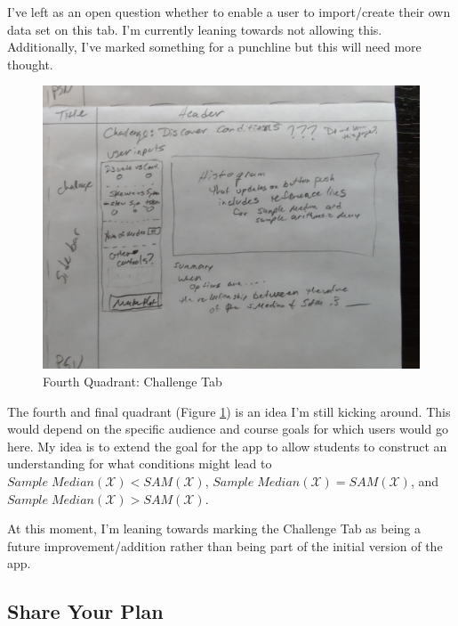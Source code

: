 \documentclass[
]{book}
\begin{document}
I've left as an open question whether to enable a user to import/create their own data set on this tab. I'm currently leaning towards not allowing this. Additionally, I've marked something for a punchline but this will need more thought.

\begin{figure}

{\centering \includegraphics[width=22.22in]{images/planSketch5-Challenge} 

}

\caption{Fourth Quadrant: Challenge Tab}\label{fig:planSketchChallenge}
\end{figure}

The fourth and final quadrant (Figure \ref{fig:planSketchChallenge}) is an idea I'm still kicking around. This would depend on the specific audience and course goals for which users would go here. My idea is to extend the goal for the app to allow students to construct an understanding for what conditions might lead to \(Sample\;Median\left(\mathcal{X}\right)<SAM\left(\mathcal{X}\right)\), \(Sample\;Median\left(\mathcal{X}\right)=SAM\left(\mathcal{X}\right)\), and \(Sample\;Median\left(\mathcal{X}\right)>SAM\left(\mathcal{X}\right)\).

At this moment, I'm leaning towards marking the Challenge Tab as being a future improvement/addition rather than being part of the initial version of the app.

\hypertarget{share-your-plan}{%
\subsection{Share Your Plan}\label{share-your-plan}}
\end{document}
